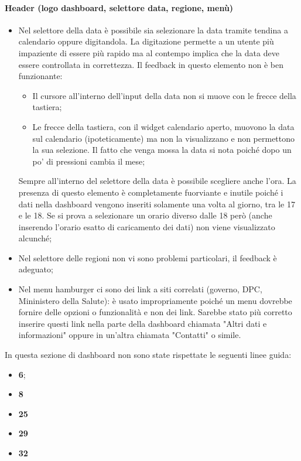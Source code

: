 \paragraph{Header (logo dashboard, selettore data, regione, menù)}
\begin{itemize}
    \item Nel selettore della data è possibile sia selezionare la data tramite tendina a calendario oppure digitandola. La digitazione permette a un utente più impaziente di essere più rapido ma al contempo implica che la data deve essere controllata in correttezza. Il feedback in questo elemento non è ben funzionante:
    \begin{itemize}
        \item Il cursore all'interno dell'input della data non si muove con le frecce della tastiera;
        \item Le frecce della tastiera, con il widget calendario aperto, muovono la data sul calendario (ipoteticamente) ma non la visualizzano e non permettono la sua selezione. Il fatto che venga mossa la data si nota poiché dopo un po' di pressioni cambia il mese;
    \end{itemize}
    Sempre all'interno del selettore della data è possibile scegliere anche l'ora. La presenza di questo elemento è completamente fuorviante e inutile poiché i dati nella dashboard vengono inseriti solamente una volta al giorno, tra le 17 e le 18. Se  si prova a selezionare un orario diverso dalle 18 però (anche inserendo l'orario esatto di caricamento dei dati) non viene visualizzato alcunché;
    \item Nel selettore delle regioni non vi sono problemi particolari, il feedback è adeguato;
    \item Nel menu hamburger ci sono dei link a siti correlati (governo, DPC, Mininistero della Salute): è usato impropriamente poiché un menu dovrebbe fornire delle opzioni o funzionalità e non dei link. Sarebbe stato più corretto inserire questi link nella parte della dashboard chiamata "Altri dati e informazioni" oppure in un'altra chiamata "Contatti" o simile.
\end{itemize}
In questa sezione di dashboard non sono state rispettate le seguenti linee guida:
\begin{itemize}
    \item \textbf{6};
    \item \textbf{8}
    \item \textbf{25}
    \item \textbf{29}
    \item \textbf{32}
\end{itemize}

